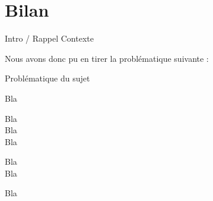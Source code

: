 \chapter{Bilan}

Intro / Rappel Contexte

Nous avons donc pu en tirer la problématique suivante :

\begin{center}
\hskip7mm
Problématique du sujet
\end{center}

Bla

Bla\\

Bla\\

Bla

Bla\\

Bla

Bla
